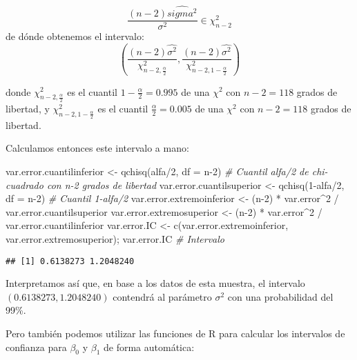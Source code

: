 \documentclass[
]{article}
\newenvironment{Shaded}{\begin{snugshade}}{\end{snugshade}}
\newcommand{\AttributeTok}[1]{\textcolor[rgb]{0.77,0.63,0.00}{#1}}
\newcommand{\CommentTok}[1]{\textcolor[rgb]{0.56,0.35,0.01}{\textit{#1}}}
\newcommand{\DecValTok}[1]{\textcolor[rgb]{0.00,0.00,0.81}{#1}}
\newcommand{\FunctionTok}[1]{\textcolor[rgb]{0.00,0.00,0.00}{#1}}
\newcommand{\NormalTok}[1]{#1}
\newcommand{\OtherTok}[1]{\textcolor[rgb]{0.56,0.35,0.01}{#1}}
\newcommand{\SpecialCharTok}[1]{\textcolor[rgb]{0.00,0.00,0.00}{#1}}
\begin{document}
\[
\frac{(n-2)\hat{sigma^2}}{\sigma^2} \in \chi^2_{n-2}
\] de dónde obtenemos el intervalo: \[
(\frac{(n-2)\hat{\sigma^2}}{\chi^2_{n-2, \frac{\alpha}{2}}}, \frac{(n-2)\hat{\sigma^2}}{\chi^2_{n-2, 1-\frac{\alpha}{2}}})
\]

donde \(\chi^2_{n-2, \frac{\alpha}{2}}\) es el cuantil
\(1-\frac{\alpha}{2}=0.995\) de una \(\chi^2\) con \(n-2=118\) grados de
libertad, y \(\chi^2_{n-2, 1-\frac{\alpha}{2}}\) es el cuantil
\(\frac{\alpha}{2}=0.005\) de una \(\chi^2\) con \(n-2=118\) grados de
libertad.

Calculamos entonces este intervalo a mano:

\begin{Shaded}
\begin{Highlighting}[]
\NormalTok{var.error.cuantilinferior }\OtherTok{\textless{}{-}} \FunctionTok{qchisq}\NormalTok{(alfa}\SpecialCharTok{/}\DecValTok{2}\NormalTok{, }\AttributeTok{df =}\NormalTok{ n}\DecValTok{{-}2}\NormalTok{)       }\CommentTok{\# Cuantil alfa/2 de chi{-}cuadrado con n{-}2 grados de libertad}
\NormalTok{var.error.cuantilsuperior }\OtherTok{\textless{}{-}} \FunctionTok{qchisq}\NormalTok{(}\DecValTok{1}\SpecialCharTok{{-}}\NormalTok{alfa}\SpecialCharTok{/}\DecValTok{2}\NormalTok{, }\AttributeTok{df =}\NormalTok{ n}\DecValTok{{-}2}\NormalTok{)     }\CommentTok{\# Cuantil 1{-}alfa/2}
\NormalTok{var.error.extremoinferior }\OtherTok{\textless{}{-}}\NormalTok{ (n}\DecValTok{{-}2}\NormalTok{) }\SpecialCharTok{*}\NormalTok{ var.error}\SpecialCharTok{\^{}}\DecValTok{2} \SpecialCharTok{/}\NormalTok{ var.error.cuantilsuperior}
\NormalTok{var.error.extremosuperior }\OtherTok{\textless{}{-}}\NormalTok{ (n}\DecValTok{{-}2}\NormalTok{) }\SpecialCharTok{*}\NormalTok{ var.error}\SpecialCharTok{\^{}}\DecValTok{2} \SpecialCharTok{/}\NormalTok{ var.error.cuantilinferior}
\NormalTok{var.error.IC }\OtherTok{\textless{}{-}} \FunctionTok{c}\NormalTok{(var.error.extremoinferior, var.error.extremosuperior); var.error.IC     }\CommentTok{\# Intervalo}
\end{Highlighting}
\end{Shaded}

\begin{verbatim}
## [1] 0.6138273 1.2048240
\end{verbatim}

Interpretamos así que, en base a los datos de esta muestra, el intervalo
\((0.6138273, 1.2048240)\) contendrá al parámetro \(\sigma^2\) con una
probabilidad del 99\%.

Pero también podemos utilizar las funciones de R para calcular los
intervalos de confianza para \(\beta_0\) y \(\beta_1\) de forma
automática:
\end{document}
